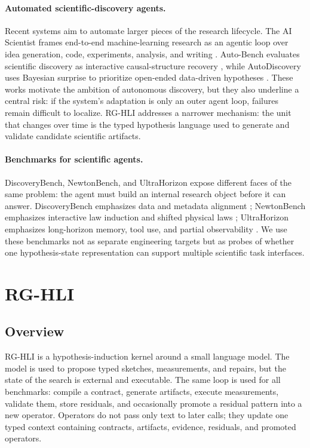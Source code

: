\documentclass[letterpaper]{article}
\newcommand{\methodshort}{\textsc{RG-HLI}\xspace}
\begin{document}
\paragraph{Automated scientific-discovery agents.}
Recent systems aim to automate larger pieces of the research lifecycle. The AI
Scientist frames end-to-end machine-learning research as an agentic loop over
idea generation, code, experiments, analysis, and writing
\citep{aiscientist,aiscientistnature}. Auto-Bench evaluates scientific
discovery as interactive causal-structure recovery \citep{autobench}, while
AutoDiscovery uses Bayesian surprise to prioritize open-ended data-driven
hypotheses \citep{autodiscovery}. These works motivate the ambition of
autonomous discovery, but they also underline a central risk: if the system's
adaptation is only an outer agent loop, failures remain difficult to localize.
\methodshort addresses a narrower mechanism: the unit that changes over time is
the typed hypothesis language used to generate and validate candidate
scientific artifacts.

\paragraph{Benchmarks for scientific agents.}
DiscoveryBench, NewtonBench, and UltraHorizon expose different faces of the same
problem: the agent must build an internal research object before it can answer.
DiscoveryBench emphasizes data and metadata alignment \citep{discoverybench};
NewtonBench emphasizes interactive law induction and shifted physical laws
\citep{newtonbench}; UltraHorizon emphasizes long-horizon memory, tool use, and
partial observability \citep{ultrahorizon}. We use these benchmarks not as
separate engineering targets but as probes of whether one hypothesis-state
representation can support multiple scientific task interfaces.

\section{\methodshort}
\label{sec:rghli_method}

\subsection{Overview}

\methodshort is a hypothesis-induction kernel around a small language model. The
model is used to propose typed sketches, measurements, and repairs, but the
state of the search is external and executable. The same loop is used for all
benchmarks: compile a contract, generate artifacts, execute measurements,
validate them, store residuals, and occasionally promote a residual pattern into
a new operator. Operators do not pass only text to later calls; they update one
typed context containing contracts, artifacts, evidence, residuals, and
promoted operators.
\end{document}
